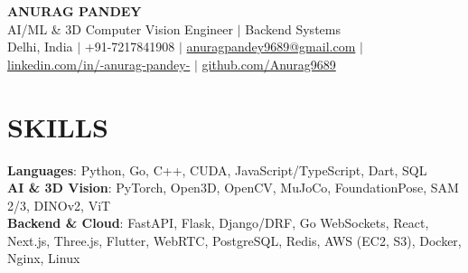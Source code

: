 \documentclass[10pt,a4paper]{article}
\begin{document}
\begin{center}
    {\LARGE \textbf{ANURAG PANDEY}} \\ \vspace{2pt}
    {\small AI/ML \& 3D Computer Vision Engineer $|$ Backend Systems} \\ \vspace{2pt}
    \small Delhi, India $|$ +91-7217841908 $|$ \href{mailto:anuragpandey9689@gmail.com}{anuragpandey9689@gmail.com} $|$ \href{https://www.linkedin.com/in/-anurag-pandey-}{linkedin.com/in/-anurag-pandey-} $|$ \href{https://github.com/Anurag9689}{github.com/Anurag9689}
\end{center}
\vspace{-6pt}

\section{SKILLS}
 \begin{itemize}[leftmargin=0.05in, label={}]
    \small{\item{
     \textbf{Languages}{: Python, Go, C++, CUDA, JavaScript/TypeScript, Dart, SQL} \\
     \textbf{AI \& 3D Vision}{: PyTorch, Open3D, OpenCV, MuJoCo, FoundationPose, SAM 2/3, DINOv2, ViT} \\
     \textbf{Backend \& Cloud}{: FastAPI, Flask, Django/DRF, Go WebSockets, React, Next.js, Three.js, Flutter, WebRTC, PostgreSQL, Redis, AWS (EC2, S3), Docker, Nginx, Linux}
    }}
 \end{itemize}
\vspace{-6pt}

\end{document}
